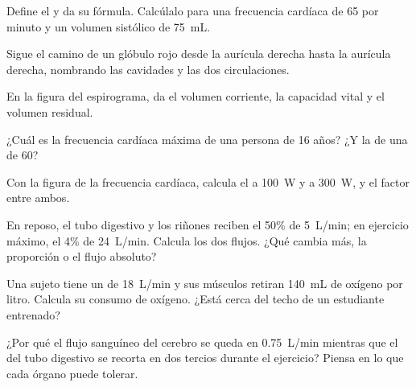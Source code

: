 \begin{exercise}[$\star$]\label{exo:g10:heart-lungs-effort:2}
Define el  y da su fórmula. Calcúlalo para una frecuencia
cardíaca de 65 por minuto y un volumen sistólico de \qty{75}{mL}.
\end{exercise}

\begin{exercise}[$\star$]\label{exo:g10:heart-lungs-effort:3}
Sigue el camino de un glóbulo rojo desde la aurícula derecha hasta la
aurícula derecha, nombrando las cavidades y las dos circulaciones.
\end{exercise}

\begin{exercise}[$\star$]\label{exo:g10:heart-lungs-effort:4}
En la figura del espirograma, da el volumen corriente, la capacidad
vital y el volumen residual.
\end{exercise}

\begin{exercise}[$\star$]\label{exo:g10:heart-lungs-effort:5}
¿Cuál es la frecuencia cardíaca máxima de una persona de 16 años? ¿Y la
de una de 60?
\end{exercise}

\begin{exercise}[$\star\star$]\label{exo:g10:heart-lungs-effort:6}
Con la figura de la frecuencia cardíaca, calcula el  a
\qty{100}{W} y a \qty{300}{W}, y el factor entre ambos.
\end{exercise}

\begin{exercise}[$\star\star$]\label{exo:g10:heart-lungs-effort:7}
En reposo, el tubo digestivo y los riñones reciben el 50\% de
\qty{5}{L/min}; en ejercicio máximo, el 4\% de \qty{24}{L/min}. Calcula
los dos flujos. ¿Qué cambia más, la proporción o el flujo absoluto?
\end{exercise}

\begin{exercise}[$\star\star$]\label{exo:g10:heart-lungs-effort:8}
Una sujeto tiene un  de \qty{18}{L/min} y sus músculos
retiran \qty{140}{mL} de oxígeno por litro. Calcula su consumo de
oxígeno. ¿Está cerca del techo de un estudiante entrenado?
\end{exercise}

\begin{exercise}[$\star\star$]\label{exo:g10:heart-lungs-effort:9}
¿Por qué el flujo sanguíneo del cerebro se queda en \qty{0.75}{L/min}
mientras que el del tubo digestivo se recorta en dos tercios durante el
ejercicio? Piensa en lo que cada órgano puede tolerar.
\end{exercise}

